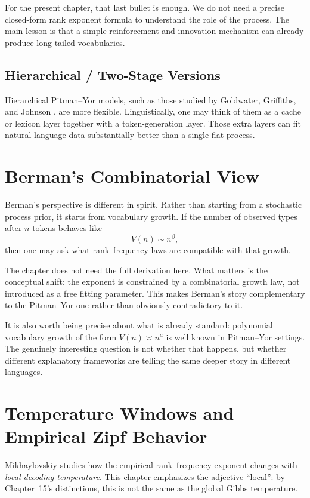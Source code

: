 For the present chapter, that last bullet is enough. We do not need a precise closed-form rank exponent formula to understand the role of the process. The main lesson is that a simple reinforcement-and-innovation mechanism can already produce long-tailed vocabularies.

\subsection{Hierarchical / Two-Stage Versions}

Hierarchical Pitman--Yor models, such as those studied by Goldwater, Griffiths, and Johnson \cite{GoldwaterGriffithsJohnson2011}, are more flexible. Linguistically, one may think of them as a cache or lexicon layer together with a token-generation layer. Those extra layers can fit natural-language data substantially better than a single flat process.

\section{Berman's Combinatorial View}

Berman's perspective is different in spirit. Rather than starting from a stochastic process prior, it starts from vocabulary growth. If the number of observed types after $n$ tokens behaves like
\[
  V(n) \sim n^\beta,
\]
then one may ask what rank--frequency laws are compatible with that growth.

The chapter does not need the full derivation here. What matters is the conceptual shift: the exponent is constrained by a combinatorial growth law, not introduced as a free fitting parameter. This makes Berman's story complementary to the Pitman--Yor one rather than obviously contradictory to it.

It is also worth being precise about what is already standard: polynomial vocabulary growth of the form $V(n) \asymp n^a$ is well known in Pitman--Yor settings. The genuinely interesting question is not whether that happens, but whether different explanatory frameworks are telling the same deeper story in different languages.

\section{Temperature Windows and Empirical Zipf Behavior}

Mikhaylovskiy \cite{Mikhaylovskiy2025b} studies how the empirical rank--frequency exponent changes with \emph{local decoding temperature}. This chapter emphasizes the adjective ``local'': by Chapter~15's distinctions, this is not the same as the global Gibbs temperature.

